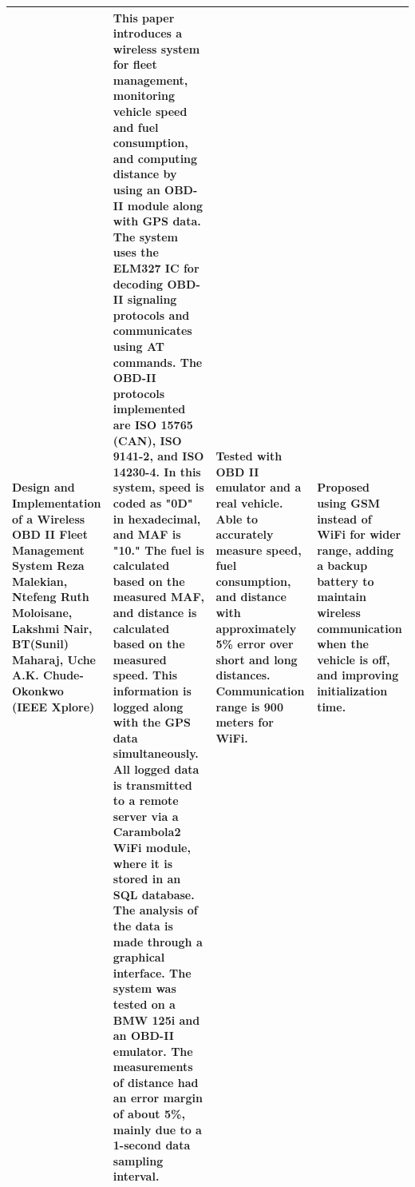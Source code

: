 \begin{longtable}{|p{}|p{}|p{}|p{}|}
\hline
Design and Implementation of a Wireless OBD II Fleet Management System
\newline
Reza Malekian, Ntefeng Ruth Moloisane, Lakshmi Nair, BT(Sunil) Maharaj, Uche A.K. Chude-Okonkwo
\newline
(IEEE Xplore) &
This paper introduces a wireless system for fleet management, monitoring vehicle speed and fuel consumption, and computing distance by using an OBD-II module along with GPS data. The system uses the ELM327 IC for decoding OBD-II signaling protocols and communicates using AT commands. The OBD-II protocols implemented are ISO 15765 (CAN), ISO 9141-2, and ISO 14230-4.
\newline
In this system, speed is coded as "0D" in hexadecimal, and MAF is "10." The fuel is calculated based on the measured MAF, and distance is calculated based on the measured speed. This information is logged along with the GPS data simultaneously.
\newline
All logged data is transmitted to a remote server via a Carambola2 WiFi module, where it is stored in an SQL database. The analysis of the data is made through a graphical interface. The system was tested on a BMW 125i and an OBD-II emulator. The measurements of distance had an error margin of about 5\%, mainly due to a 1-second data sampling interval. &
Tested with OBD II emulator and a real vehicle. Able to accurately measure speed, fuel consumption, and distance with approximately 5\% error over short and long distances. Communication range is 900 meters for WiFi. &
Proposed using GSM instead of WiFi for wider range, adding a backup battery to maintain wireless communication when the vehicle is off, and improving initialization time. \\
\hline


\end{longtable}
